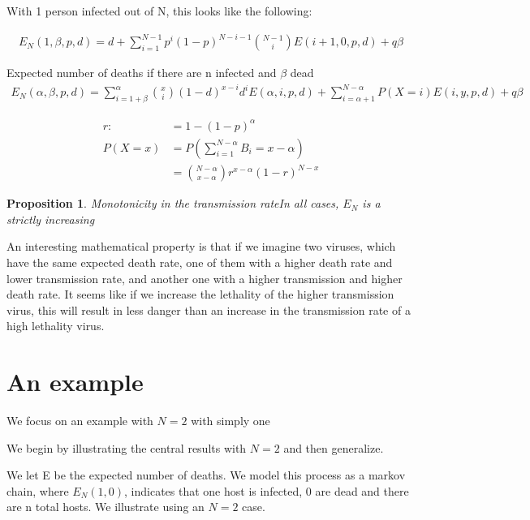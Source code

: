 \documentclass[12pt]{report}
\newtheorem{proposition}{Proposition}
\numberwithin{equation}{section}
\begin{document}
With 1 person infected out of N, this looks like the following: 

\begin{align*}
E_N(1,\beta,p,d) = d + \sum_{i=1}^{N-1}p^i(1-p)^{N-i-1}\binom{N-1}{i}E(i+1,0,p,d ) + q \beta
\end{align*}

Expected number of deaths if there are n infected and $\beta$ dead
\begin{align*}
E_N(\alpha,\beta,p,d ) = \sum_{i = 1+ \beta}^{\alpha} \binom{x}{i}(1-d)^{x-i}d^i E( \alpha , i,p,d ) + \sum_{i=\alpha+1}^{N-\alpha} P(X=i)E(i,y,p,d ) + q \beta
\end{align*}

\begin{align*}
r: &=1-(1-p)^{\alpha} \\
P(X=x)&=P\left(\sum_{i=1}^{N-\alpha}B_i=x-\alpha \right) \\
&=\binom{N- \alpha}{x-\alpha}r^{x-\alpha}(1-r)^{N-x}
\end{align*}

\begin{proposition}{Monotonicity in the transmission rate}\label{prop1}
In all cases, $E_N$ is a strictly increasing 
\end{proposition}

An interesting mathematical property is that if we imagine two viruses, which have the same expected death rate, one of them with a higher death rate and lower transmission rate, and another one with a higher transmission and higher death rate. It seems like if we increase the lethality of the higher transmission virus, this will result in less danger than an increase in the transmission rate of a high lethality virus. 


\section{An example}

We focus on an example with $N=2$ with simply one 


We begin by illustrating the central results with $N=2$ and then generalize. 

We let E be the expected number of deaths. We model this process as a markov chain, where $E_N(1,0)$, indicates that one host is infected, $0$ are dead and there are n total hosts. We illustrate using an $N=2$ case.
\end{document}
